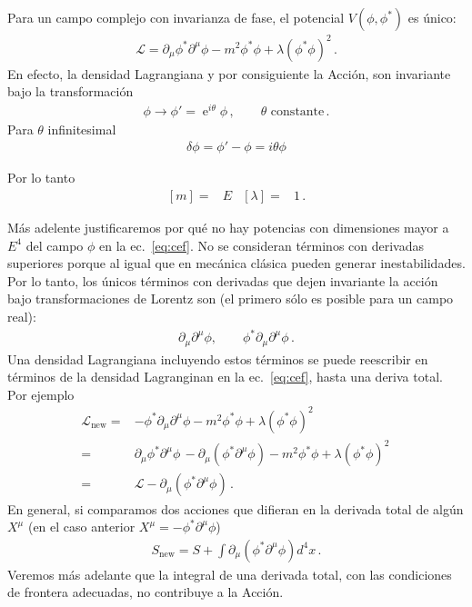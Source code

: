 Para un campo complejo con invarianza de fase, el potencial $V(\phi,\phi^{*})$ es único:
\begin{align}
\label{eq:cef}
  \mathcal{L}=\partial_{\mu}\phi^{*} \partial^{\mu}\phi-m^2\phi^{*}\phi+\lambda \left(\phi^{*}\phi \right)^2\,.
\end{align}
En efecto, la densidad Lagrangiana y por consiguiente la Acción, son invariante bajo la transformación
\begin{align}
  \phi\to \phi'=\operatorname{e}^{i\theta}\phi\,,\qquad \text{$\theta$ constante}\,.
\end{align}
Para $\theta$ infinitesimal
\begin{align}
\label{eq:deltaphi}
  \delta\phi=\phi'-\phi=i\theta\phi
\end{align}



Por lo tanto
\begin{align}
  \left[ m \right]=&E& \left[ \lambda \right]=&1\,.
\end{align}


Más adelente justificaremos por qué no hay potencias con dimensiones mayor a $E^{4}$ del campo $\phi$ en la ec.~\eqref{eq:cef}. No se consideran términos con derivadas superiores porque al igual que en mecánica clásica pueden generar inestabilidades. Por lo tanto, los únicos términos con derivadas que dejen invariante la acción bajo transformaciones de Lorentz son (el primero sólo es posible para un campo real):
\begin{align}
  \partial_{\mu}\partial^{\mu}\phi,\qquad \phi^{*}\partial_{\mu}\partial^{\mu}\phi\,.
\end{align}
Una densidad Lagrangiana incluyendo estos términos se puede reescribir en términos de la densidad Lagranginan en la ec.~\eqref{eq:cef}, hasta una deriva total. Por ejemplo
\begin{align}
  \mathcal{L}_{\text{new}}=&-\phi^{*}\partial_{\mu}\partial^{\mu}\phi-m^2\phi^{*}\phi+\lambda \left(\phi^{*}\phi \right)^2\,\nonumber\\
=&\partial_{\mu}\phi^{*}\partial^{\mu}\phi\,-\partial_{\mu}\left(\phi^{*}\partial^{\mu}\phi\right)-m^2\phi^{*}\phi+\lambda \left(\phi^{*}\phi \right)^2\,\nonumber\\
=&\mathcal{L}-\partial_{\mu}\left(\phi^{*}\partial^{\mu}\phi\right)\,.
\end{align}
En general, si comparamos dos acciones que difieran en la derivada total de algún $X^{\mu}$ (en el caso anterior $X^{\mu}=-\phi^{*}\partial^{\mu}\phi$)
\begin{align}
  S_{\text{new}}=S+\int \partial_{\mu}\left(\phi^{*}\partial^{\mu}\phi\right)d^4x\,.
\end{align}
Veremos más adelante que la integral de una derivada total, con las condiciones de frontera adecuadas, no contribuye a la Acción.



